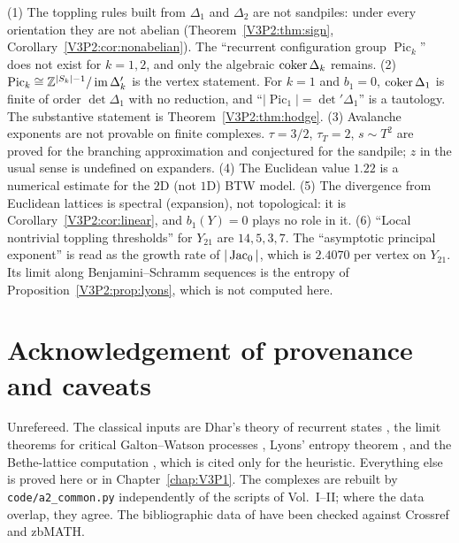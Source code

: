 \begin{remark}\label{V3P2:rem:corrections}
(1) The toppling rules built from $\Delta_1$ and $\Delta_2$ are not sandpiles: under every
orientation they are not abelian (Theorem~\ref{V3P2:thm:sign},
Corollary~\ref{V3P2:cor:nonabelian}). The ``recurrent configuration group
$\operatorname{Pic}_k$'' does not exist for $k=1,2$, and only the algebraic
$\operatorname{coker}\Delta_k$ remains. (2) $\operatorname{Pic}_k\cong\mathbb{Z}^{|S_k|-1}/\operatorname{im}\Delta_k'$
is the vertex statement. For $k=1$ and $b_1=0$, $\operatorname{coker}\Delta_1$ is finite of order
$\det\Delta_1$ with no reduction, and ``$|\operatorname{Pic}_1|=\det'\Delta_1$'' is a
tautology. The substantive statement is Theorem~\ref{V3P2:thm:hodge}. (3) Avalanche exponents
are not provable on finite complexes. $\tau=3/2$, $\tau_T=2$, $s\sim T^{2}$ are proved for the
branching approximation and conjectured for the sandpile; $z$ in the usual sense is undefined
on expanders. (4) The Euclidean value $1.22$ is a numerical estimate for the $2$D (not $1$D)
BTW model. (5) The divergence from Euclidean lattices is spectral (expansion), not
topological: it is Corollary~\ref{V3P2:cor:linear}, and $b_1(Y)=0$ plays no role in it.
(6) ``Local nontrivial toppling thresholds'' for $Y_{21}$ are $14,5,3,7$. The ``asymptotic
principal exponent'' is read as the growth rate of $|\operatorname{Jac}_0|$, which is
$2.4070$ per vertex on $Y_{21}$. Its limit along Benjamini--Schramm sequences is the entropy
of Proposition~\ref{V3P2:prop:lyons}, which is not computed here.
\end{remark}

\section*{Acknowledgement of provenance and caveats}

Unrefereed. The classical inputs are Dhar's theory of recurrent states \cite{Dhar90}, the
limit theorems for critical Galton--Watson processes \cite{Harris63}, Lyons' entropy theorem
\cite{Lyons2005}, and the Bethe-lattice computation \cite{DM90}, which is cited only for the
heuristic. Everything else is proved here or in Chapter~\ref{chap:V3P1}. The complexes are rebuilt by
\texttt{code/a2\_common.py} independently of the scripts of Vol.~I--II; where the data
overlap, they agree. The bibliographic data of \cite{Dhar90,DM90,Harris63} have been checked against Crossref and zbMATH.
